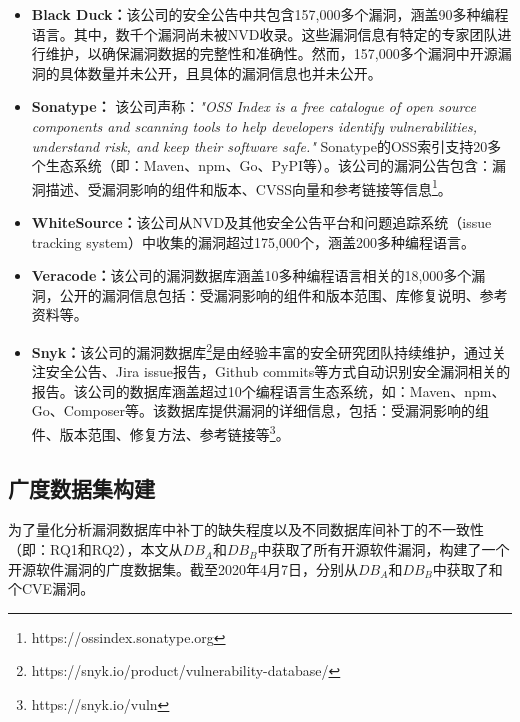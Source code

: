 \begin{itemize}[leftmargin=*]
\item\textbf{Black Duck：}该公司的安全公告中共包含157,000多个漏洞，涵盖90多种编程语言。其中，数千个漏洞尚未被NVD收录。这些漏洞信息有特定的专家团队进行维护，以确保漏洞数据的完整性和准确性。然而，157,000多个漏洞中开源漏洞的具体数量并未公开，且具体的漏洞信息也并未公开。
\item\textbf{Sonatype：} 该公司声称：\textit{"OSS Index is a free catalogue of open source components and scanning tools to help developers identify vulnerabilities, understand risk, and keep their software safe."} Sonatype的OSS索引支持20多个生态系统（即：Maven、npm、Go、PyPI等）。该公司的漏洞公告包含：漏洞描述、受漏洞影响的组件和版本、CVSS向量和参考链接等信息\footnote{https://ossindex.sonatype.org}。
\item\textbf{WhiteSource：}该公司从NVD及其他安全公告平台和问题追踪系统（issue tracking system）中收集的漏洞超过175,000个，涵盖200多种编程语言。
\item\textbf{Veracode：}该公司的漏洞数据库涵盖10多种编程语言相关的18,000多个漏洞，公开的漏洞信息包括：受漏洞影响的组件和版本范围、库修复说明、参考资料等。
\item\textbf{Snyk：}该公司的漏洞数据库\footnote{https://snyk.io/product/vulnerability-database/}是由经验丰富的安全研究团队持续维护，通过关注安全公告、Jira issue报告，Github commits等方式自动识别安全漏洞相关的报告。该公司的数据库涵盖超过10个编程语言生态系统，如：Maven、npm、Go、Composer等。该数据库提供漏洞的详细信息，包括：受漏洞影响的组件、版本范围、修复方法、参考链接等\footnote{https://snyk.io/vuln}。
\end{itemize}



\subsection{广度数据集构建}
为了量化分析漏洞数据库中补丁的缺失程度以及不同数据库间补丁的不一致性（即：RQ1和RQ2），本文从$DB_A$和$DB_B$中获取了所有开源软件漏洞，构建了一个开源软件漏洞的广度数据集。截至2020年4月7日，分别从$DB_A$和$DB_B$中获取了和个CVE漏洞。


